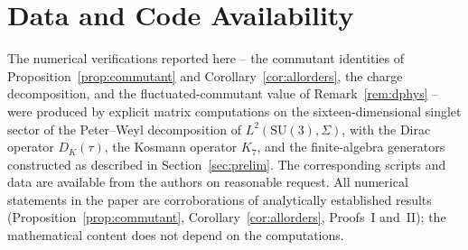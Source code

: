 \documentclass[12pt]{article}
\theoremstyle{definition}
\theoremstyle{remark}
\begin{document}
\section*{Data and Code Availability}

The numerical verifications reported here -- the commutant identities of Proposition~\ref{prop:commutant} and Corollary~\ref{cor:allorders}, the charge decomposition, and the fluctuated-commutant value of Remark~\ref{rem:dphys} -- were produced by explicit matrix computations on the sixteen-dimensional singlet sector of the Peter--Weyl decomposition of $L^2(\mathrm{SU}(3),\Sigma)$, with the Dirac operator $D_K(\tau)$, the Kosmann operator $K_7$, and the finite-algebra generators constructed as described in Section~\ref{sec:prelim}.  The corresponding scripts and data are available from the authors on reasonable request.  All numerical statements in the paper are corroborations of analytically established results (Proposition~\ref{prop:commutant}, Corollary~\ref{cor:allorders}, Proofs~I and~II); the mathematical content does not depend on the computations.





\end{document}
